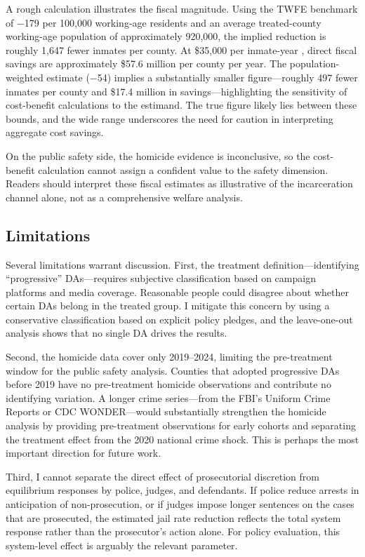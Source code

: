 \documentclass[12pt]{article}
\begin{document}
A rough calculation illustrates the fiscal magnitude. Using the TWFE benchmark of $-$179 per 100,000 working-age residents and an average treated-county working-age population of approximately 920,000, the implied reduction is roughly 1,647 fewer inmates per county. At \$35,000 per inmate-year \citep{bjs2023expenditure}, direct fiscal savings are approximately \$57.6 million per county per year. The population-weighted estimate ($-$54) implies a substantially smaller figure---roughly 497 fewer inmates per county and \$17.4 million in savings---highlighting the sensitivity of cost-benefit calculations to the estimand. The true figure likely lies between these bounds, and the wide range underscores the need for caution in interpreting aggregate cost savings.

On the public safety side, the homicide evidence is inconclusive, so the cost-benefit calculation cannot assign a confident value to the safety dimension. Readers should interpret these fiscal estimates as illustrative of the incarceration channel alone, not as a comprehensive welfare analysis.

\subsection{Limitations}

Several limitations warrant discussion. First, the treatment definition---identifying ``progressive'' DAs---requires subjective classification based on campaign platforms and media coverage. Reasonable people could disagree about whether certain DAs belong in the treated group. I mitigate this concern by using a conservative classification based on explicit policy pledges, and the leave-one-out analysis shows that no single DA drives the results.

Second, the homicide data cover only 2019--2024, limiting the pre-treatment window for the public safety analysis. Counties that adopted progressive DAs before 2019 have no pre-treatment homicide observations and contribute no identifying variation. A longer crime series---from the FBI's Uniform Crime Reports or CDC WONDER---would substantially strengthen the homicide analysis by providing pre-treatment observations for early cohorts and separating the treatment effect from the 2020 national crime shock. This is perhaps the most important direction for future work.

Third, I cannot separate the direct effect of prosecutorial discretion from equilibrium responses by police, judges, and defendants. If police reduce arrests in anticipation of non-prosecution, or if judges impose longer sentences on the cases that are prosecuted, the estimated jail rate reduction reflects the total system response rather than the prosecutor's action alone. For policy evaluation, this system-level effect is arguably the relevant parameter.
\end{document}

